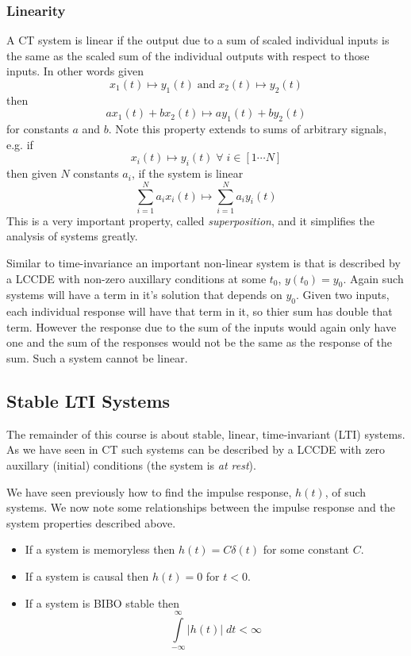 \subsubsection{Linearity}

A CT system is linear if the output due to a sum of scaled individual inputs is the same as the scaled sum of the individual outputs with respect to those inputs. In other words given
\[
x_1(t) \mapsto y_1(t) \;\text{and}\; x_2(t) \mapsto y_2(t)
\]
then
\[
a x_1(t) + b x_2(t) \mapsto a y_1(t) + b y_2(t)
\]
for constants $a$ and $b$.
Note this property extends to sums of arbitrary signals, e.g. if
\[
x_i(t) \mapsto y_i(t) \; \forall\; i \in [1 \cdots N]
\]
then given $N$ constants $a_i$, if the system is linear
\[
\sum\limits_{i = 1}^N a_i x_i(t) \mapsto \sum\limits_{i = 1}^N a_i y_i(t) 
\]
This is a very important property, called {\it superposition}, and it simplifies the analysis of systems greatly.

Similar to time-invariance an important non-linear system is that is described by a LCCDE with non-zero auxillary conditions at some $t_0$, $y(t_0) = y_0$. Again such systems will have a term in it's solution that depends on $y_0$. Given two inputs, each individual response will have that term in it, so thier sum has double that term. However the response due to the sum of the inputs would again only have one and the sum of the responses would not be the same as the response of the sum. Such a system cannot be linear.

\subsection{Stable LTI Systems}

The remainder of this course is about stable, linear, time-invariant (LTI) systems. As we have seen in CT such systems can be described by a LCCDE with zero auxillary (initial) conditions (the system is \emph{at rest}). 

We have seen previously how to find the impulse response, $h(t)$, of such systems. We now note some relationships between the impulse response and the system properties described above.

\begin{itemize}
\item If a system is memoryless then $h(t) = C \delta(t)$ for some constant $C$.
\item If a system is causal then  $h(t) = 0$ for $t < 0$.
\item If a system is BIBO stable then
  \[
  \int\limits_{-\infty}^{\infty} |h(t)| \; dt < \infty
  \]
\end{itemize}

